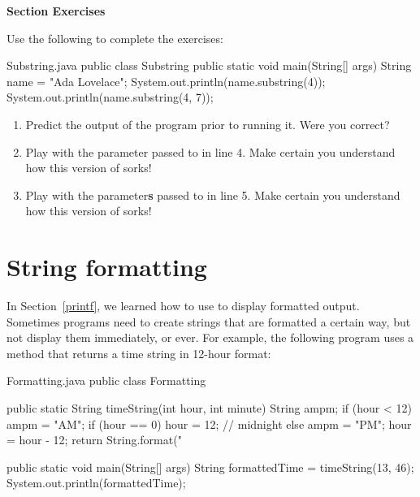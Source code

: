 \textbf{Section Exercises}

Use the following to complete the exercises:

\begin{trinket} [180] {Substring.java}
public class Substring {    
    public static void main(String[] args) {
       String name = "Ada Lovelace";
       System.out.println(name.substring(4));
       System.out.println(name.substring(4, 7));
    }
}
\end{trinket}

\begin{enumerate}
\item Predict the output of the program prior to running it.  Were you correct?
\item Play with the parameter passed to  in line 4.  Make certain you understand how this version of  sorks!
\item Play with the parameter\textbf{s} passed to  in line 5.  Make certain you understand how this version of  sorks!
\end{enumerate}


\section{String formatting}


In Section~\ref{printf}, we learned how to use  to display formatted output.
Sometimes programs need to create strings that are formatted a certain way, but not display them immediately, or ever.
For example, the following program uses a method that returns a time string in 12-hour format:

\begin{trinket} [350] {Formatting.java}
public class Formatting {    

    public static String timeString(int hour, int minute) {
       String ampm;
       if (hour < 12) {
           ampm = "AM";
           if (hour == 0) {
               hour = 12;  // midnight
           }
       } else {
           ampm = "PM";
           hour = hour - 12;
       }
       return String.format("%
    }  
    
    public static void main(String[] args) {
       String formattedTime = timeString(13, 46);
       System.out.println(formattedTime);
    }
}
\end{trinket}

